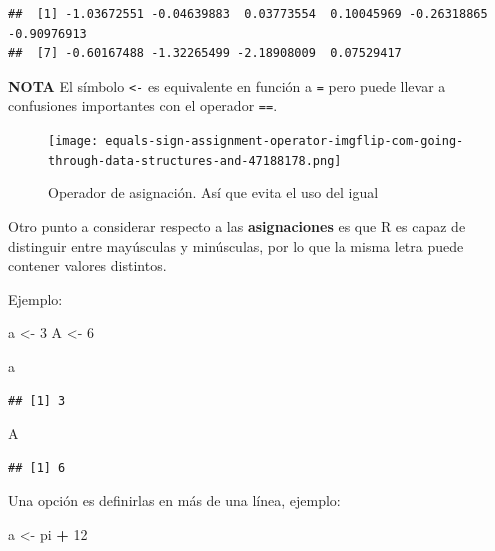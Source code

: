 \documentclass[
]{book}
\newenvironment{Shaded}{\begin{snugshade}}{\end{snugshade}}
\newcommand{\DecValTok}[1]{\textcolor[rgb]{0.00,0.00,0.81}{#1}}
\newcommand{\NormalTok}[1]{#1}
\newcommand{\OtherTok}[1]{\textcolor[rgb]{0.56,0.35,0.01}{#1}}
\newcommand{\SpecialCharTok}[1]{\textcolor[rgb]{0.81,0.36,0.00}{\textbf{#1}}}
\begin{document}
\begin{verbatim}
##  [1] -1.03672551 -0.04639883  0.03773554  0.10045969 -0.26318865 -0.90976913
##  [7] -0.60167488 -1.32265499 -2.18908009  0.07529417
\end{verbatim}

\textbf{NOTA} El símbolo \texttt{\textless{}-} es equivalente en función a \texttt{=} pero puede llevar a confusiones importantes con el operador \texttt{==}.

\begin{figure}
\centering
\texttt{[image: equals-sign-assignment-operator-imgflip-com-going-through-data-structures-and-47188178.png]}
\caption{Operador de asignación. Así que evita el uso del igual}
\end{figure}

Otro punto a considerar respecto a las \textbf{asignaciones} es que R es capaz de distinguir entre mayúsculas y minúsculas, por lo que la misma letra puede contener valores distintos.

Ejemplo:

\begin{Shaded}
\begin{Highlighting}[]
\NormalTok{a }\OtherTok{\textless{}{-}} \DecValTok{3}
\NormalTok{A }\OtherTok{\textless{}{-}} \DecValTok{6}
\end{Highlighting}
\end{Shaded}

\begin{Shaded}
\begin{Highlighting}[]
\NormalTok{a}
\end{Highlighting}
\end{Shaded}

\begin{verbatim}
## [1] 3
\end{verbatim}

\begin{Shaded}
\begin{Highlighting}[]
\NormalTok{A}
\end{Highlighting}
\end{Shaded}

\begin{verbatim}
## [1] 6
\end{verbatim}

Una opción es definirlas en más de una línea, ejemplo:

\begin{Shaded}
\begin{Highlighting}[]
\NormalTok{a }\OtherTok{\textless{}{-}}
\NormalTok{  pi }\SpecialCharTok{+} \DecValTok{12}
\end{Highlighting}
\end{Shaded}
\end{document}
